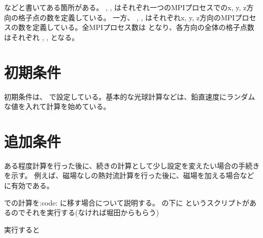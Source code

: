 \documentclass[letterpaper,10pt,dvipdfmx,report]{sphinxmanual}
\begin{document}
\begin{sphinxVerbatim}[commandchars=\\\{\}]
     
     
     
\end{sphinxVerbatim}

などと書いてある箇所がある。 ,  ,  はそれぞれ一つのMPIプロセスでのx, y, z方向の格子点の数を定義している。
一方、  ,  ,  はそれぞれx, y, z方向のMPIプロセスの数を定義している。全MPIプロセス数は  となり、各方向の全体の格子点数はそれぞれ  ,  ,  となる。


\section{初期条件}
\label{\detokenize{start:id10}}
初期条件は、  で設定している。基本的な光球計算などは、鉛直速度にランダムな値を入れて計算を始めている。


\section{追加条件}
\label{\detokenize{start:id11}}
ある程度計算を行った後に、続きの計算として少し設定を変えたい場合の手続きを示す。
例えば、磁場なしの熱対流計算を行った後に、磁場を加える場合などに有効である。

 での計算を:code: に移す場合について説明する。
 の下に  というスクリプトがあるのでそれを実行する(なければ堀田からもらう)

\begin{sphinxVerbatim}[commandchars=\\\{\}]
 
\end{sphinxVerbatim}

実行すると
\end{document}
